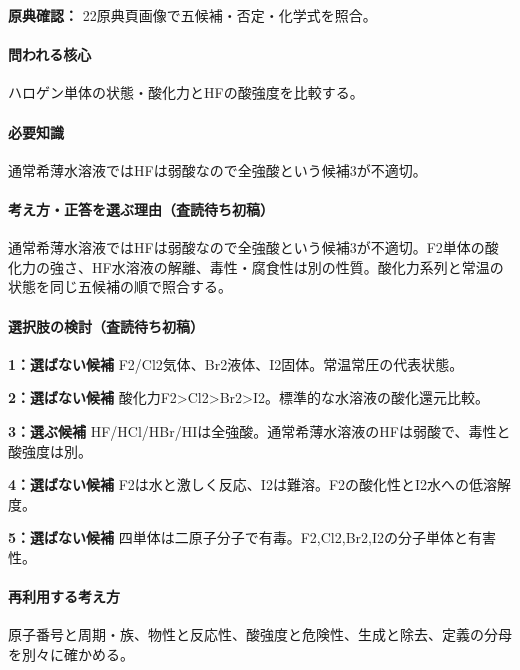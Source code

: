 \noindent\textbf{原典確認：} 22原典頁画像で五候補・否定・化学式を照合。\par

\paragraph{問われる核心} ハロゲン単体の状態・酸化力とHFの酸強度を比較する。

\paragraph{必要知識} 通常希薄水溶液ではHFは弱酸なので全強酸という候補3が不適切。

\paragraph{考え方・正答を選ぶ理由（査読待ち初稿）} 通常希薄水溶液ではHFは弱酸なので全強酸という候補3が不適切。F2単体の酸化力の強さ、HF水溶液の解離、毒性・腐食性は別の性質。酸化力系列と常温の状態を同じ五候補の順で照合する。

\paragraph{選択肢の検討（査読待ち初稿）}\mbox{}\par

\noindent\textbf{1：選ばない候補} F2/Cl2気体、Br2液体、I2固体。常温常圧の代表状態。\par

\noindent\textbf{2：選ばない候補} 酸化力F2>Cl2>Br2>I2。標準的な水溶液の酸化還元比較。\par

\noindent\textbf{3：選ぶ候補} HF/HCl/HBr/HIは全強酸。通常希薄水溶液のHFは弱酸で、毒性と酸強度は別。\par

\noindent\textbf{4：選ばない候補} F2は水と激しく反応、I2は難溶。F2の酸化性とI2水への低溶解度。\par

\noindent\textbf{5：選ばない候補} 四単体は二原子分子で有毒。F2,Cl2,Br2,I2の分子単体と有害性。\par

\paragraph{再利用する考え方} 原子番号と周期・族、物性と反応性、酸強度と危険性、生成と除去、定義の分母を別々に確かめる。

